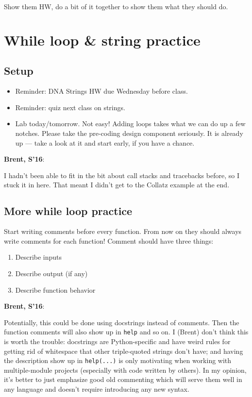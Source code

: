 \documentclass{article}
\newenvironment{reflect}[1]
{
  \noindent
  \begin{lrbox}{\reflectbox}
    \begin{minipage}[t]{\textwidth}
      \textbf{#1}:
}{
    \end{minipage}
  \end{lrbox}
  \fbox{\usebox{\reflectbox}}
}
\begin{document}
Show them HW, do a bit of it together to show them what they should
do.

\newpage

\section{While loop \& string practice}

\subsection*{Setup}
\begin{itemize}
\item Reminder: DNA Strings HW due Wednesday before class.
\item Reminder: quiz next class on strings.
\item Lab today/tomorrow.  Not easy!  Adding loops takes what we can
  do up a few notches.  Please take the pre-coding design component
  seriously.  It is already up --- take a look at it and start early,
  if you have a chance.
\end{itemize}

\begin{reflect}{Brent, S'16}
  I hadn't been able to fit in the bit about call stacks and
  tracebacks before, so I stuck it in here.  That meant I didn't get
  to the Collatz example at the end.
\end{reflect}

\subsection*{More while loop practice}

Start writing comments before every function.  From now on they should
always write comments for each function!  Comment should have three
things:
\begin{enumerate}
\item Describe inputs
\item Describe output (if any)
\item Describe function behavior
\end{enumerate}

\begin{reflect}{Brent, S'16}
  Potentially, this could be done using docstrings instead of
  comments. Then the function comments will also show up in
  \verb|help| and so on. I (Brent) don't think this is worth the
  trouble: docstrings are Python-specific and have weird rules for
  getting rid of whitespace that other triple-quoted strings don't
  have; and having the description show up in \verb|help(...)| is only
  motivating when working with multiple-module projects (especially
  with code written by others).  In my opinion, it's better
  to just emphasize good old commenting which will serve them well in
  any language and doesn't require introducing any new syntax.
\end{reflect}
\end{document}
